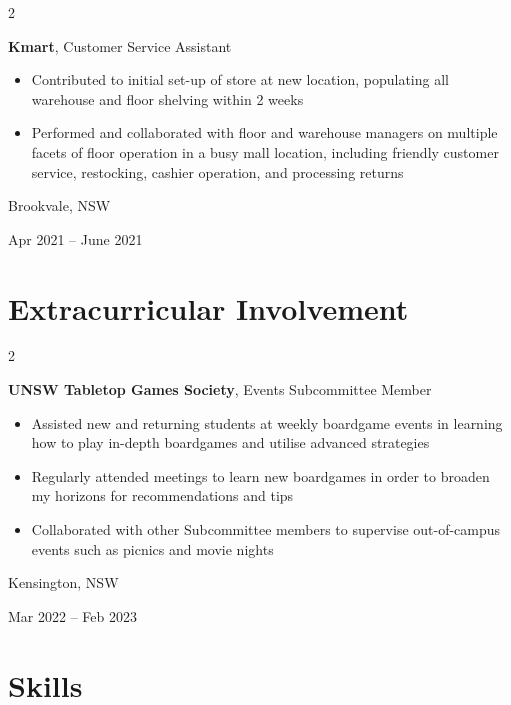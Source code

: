 \documentclass[10pt, a4paper]{article}
\newenvironment{highlights}{
    \begin{itemize}[
        topsep=0.10 cm,
        parsep=0.10 cm,
        partopsep=0pt,
        itemsep=0pt,
        leftmargin=0.4 cm + 10pt
    ]
}{
    \end{itemize}
} %
\newenvironment{twocolentry}[2][]{
    \onecolentry
    \def\secondColumn{#2}
    \setcolumnwidth{\fill, 4.5 cm}
    \begin{paracol}{2}
}{
    \switchcolumn \raggedleft \secondColumn
    \end{paracol}
    \endonecolentry
} %
\begin{document}
        \vspace{0.2 cm}

        \begin{twocolentry}{
            Brookvale, NSW

        Apr 2021 – June 2021
        }
            \textbf{Kmart}, Customer Service Assistant
            \begin{highlights}
                \item Contributed to initial set-up of store at new location, populating all warehouse and floor shelving within 2 weeks
                \item Performed and collaborated with floor and warehouse managers on multiple facets of floor operation in a busy mall location, including friendly customer service, restocking, cashier operation, and processing returns
            \end{highlights}
        \end{twocolentry}



    
    \section{Extracurricular Involvement}



        
        \begin{twocolentry}{
            Kensington, NSW

        Mar 2022 – Feb 2023
        }
            \textbf{UNSW Tabletop Games Society}, Events Subcommittee Member
            \begin{highlights}
                \item Assisted new and returning students at weekly boardgame events in learning how to play in-depth boardgames and utilise advanced strategies
                \item Regularly attended meetings to learn new boardgames in order to broaden my horizons for recommendations and tips
                \item Collaborated with other Subcommittee members to supervise out-of-campus events such as picnics and movie nights
            \end{highlights}
        \end{twocolentry}



    
    \section{Skills}
\end{document}
